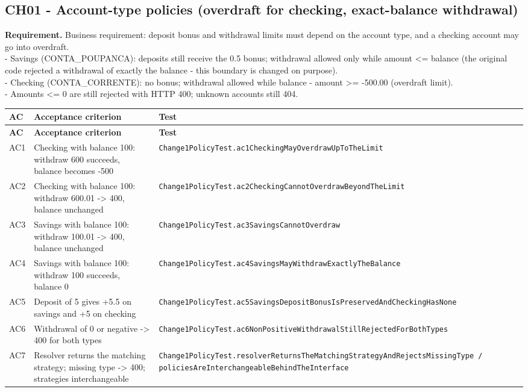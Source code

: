 \documentclass[11pt,a4paper]{article}
\begin{document}
\subsection{CH01 - Account-type policies (overdraft for checking, exact-balance withdrawal)}
\textbf{Requirement.} Business requirement: deposit bonus and withdrawal limits must depend on the account type, and a checking account may go into overdraft.\\ - Savings (CONTA\_POUPANCA): deposits still receive the 0.5 bonus; withdrawal allowed only while amount \textless{}= balance (the original code rejected a withdrawal of exactly the balance - this boundary is changed on purpose).\\ - Checking (CONTA\_CORRENTE): no bonus; withdrawal allowed while balance - amount \textgreater{}= -500.00 (overdraft limit).\\ - Amounts \textless{}= 0 are still rejected with HTTP 400; unknown accounts still 404.
{\footnotesize
\begin{longtable}{@{}p{1cm}p{7.6cm}p{7cm}@{}}
\toprule \textbf{AC} & \textbf{Acceptance criterion} & \textbf{Test} \\ \midrule \endfirsthead
\toprule \textbf{AC} & \textbf{Acceptance criterion} & \textbf{Test} \\ \midrule \endhead
\bottomrule \endfoot
AC1 & Checking with balance 100: withdraw 600 succeeds, balance becomes -500 & \texttt{Change1PolicyTest.\allowbreak{}ac1CheckingMayOverdrawUpToTheLimit} \\
AC2 & Checking with balance 100: withdraw 600.01 -\textgreater{} 400, balance unchanged & \texttt{Change1PolicyTest.\allowbreak{}ac2CheckingCannotOverdrawBeyondTheLimit} \\
AC3 & Savings with balance 100: withdraw 100.01 -\textgreater{} 400, balance unchanged & \texttt{Change1PolicyTest.\allowbreak{}ac3SavingsCannotOverdraw} \\
AC4 & Savings with balance 100: withdraw 100 succeeds, balance 0 & \texttt{Change1PolicyTest.\allowbreak{}ac4SavingsMayWithdrawExactlyTheBalance} \\
AC5 & Deposit of 5 gives +5.5 on savings and +5 on checking & \texttt{Change1PolicyTest.\allowbreak{}ac5SavingsDepositBonusIsPreservedAndCheckingHasNone} \\
AC6 & Withdrawal of 0 or negative -\textgreater{} 400 for both types & \texttt{Change1PolicyTest.\allowbreak{}ac6NonPositiveWithdrawalStillRejectedForBothTypes} \\
AC7 & Resolver returns the matching strategy; missing type -\textgreater{} 400; strategies interchangeable & \texttt{Change1PolicyTest.\allowbreak{}resolverReturnsTheMatchingStrategyAndRejectsMissingType /\allowbreak{} policiesAreInterchangeableBehindTheInterface} \\
\end{longtable}
}
\end{document}
